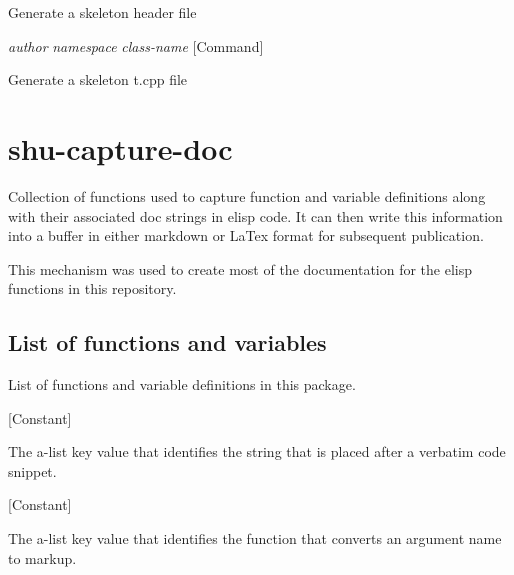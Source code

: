 \begin{doc-string}
Generate a skeleton header file
\end{doc-string}

\vspace{1em}
\noindent
{}
\usebox{\funcname}\emph{author} \emph{namespace} \emph{class-name}
 \hfill [Command]

\begin{doc-string}
Generate a skeleton t.cpp file
\end{doc-string}

\eject
\section{shu-capture-doc}


Collection of functions used to capture function and variable definitions
along with their associated doc strings in elisp code.  It can then write
this information into a buffer in either markdown or LaTex format for
subsequent publication.

This mechanism was used to create most of the documentation for the elisp
functions in this repository.


\subsection{List of functions and variables}

List of functions and variable definitions in this package.



\vspace{1em}
\noindent
{}
\usebox{\funcname}
 \hfill [Constant]

\begin{doc-string}
The a-list key value that identifies the string that is placed after a verbatim
code snippet.
\end{doc-string}

\vspace{1em}
\noindent
{}
\usebox{\funcname}
 \hfill [Constant]

\begin{doc-string}
The a-list key value that identifies the function that converts an argument name
to markup.
\end{doc-string}

